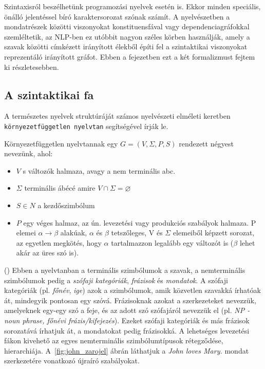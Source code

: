 Szintaxisról beszélhetünk programozási nyelvek esetén is. Ekkor minden speciális, önálló jelentéssel bíró karaktersorozat szónak számít.
A nyelvészetben a mondatrészek közötti viszonyokat konstituensfával vagy dependenciagráfokkal szemléltetik, az NLP-ben ez utóbbit nagyon széles körben használják, amely a szavak közötti címkézett irányított élekből építi fel a szintaktikai viszonyokat reprezentáló irányított gráfot. Ebben a fejezetben ezt a két formalizmust fejtem ki részletesebben.

\subsection{A szintaktikai fa}
\label{sec:tree}

A természetes nyelvek struktúráját számos nyelvészeti elméleti keretben \texttt{környezetfüggetlen nyelvtan} segítségével írják le.

Környezetfüggetlen nyelvtannak egy $G=(V,\Sigma ,P,S)$ rendezett négyest nevezünk, ahol:

\begin{itemize}
	\item \emph{$V$} s változók halmaza, avagy a nem terminális abc.
	\item \emph{$\Sigma$} terminális ábécé amire $ V \cap \Sigma =\varnothing $
	\item \emph{$S \in N$} a kezdőszimbólum
	\item \emph{$P$} egy véges halmaz, az ún. levezetési vagy produkciós szabályok halmaza. P elemei
$\alpha \to \beta$ alakúak, $\alpha$ és $\beta$ tetszőleges, V és $\Sigma$ elemeiből képzett sorozat, az egyetlen
megkötés, hogy $\alpha$ tartalmazzon legalább egy változót is ($\beta$ lehet akár az üres szó is).
\end{itemize}
(\cite{Friedl:2003})
Ebben a nyelvtanban a terminális szimbólumok a szavak, a nemterminális szimbólumok pedig a \textit{szófaji kategóriák}, \textit{frázisok} és \textit{mondatok}. A szófaji kategóriák (pl. \textit{főnév}, \textit{ige}) azok a szimbólumok, amik közvetlen szavakká írhatóak át, mindegyik pontosan egy szóvá. Frázisoknak azokat a szerkezeteket nevezzük, amelyeknek egy-egy szó a feje, és az adott szó szófajáról nevezzük el (pl. \textit{NP - noun phrase, főnévi frázis/kifejezés}). Ezeket szófaji kategóriák és más frázisok sorozatává írhatjuk át, a mondatokat pedig frázisokká.
A lehetséges levezetési fákon kivehető az egyes nemterminális szimbólumtípusok rétegződése, hierarchiája.  A~\ref{fig:john_zarojel} ábrán láthatjuk a \textit{John loves Mary.} mondat szerkezetére vonatkozó újraíró szabályokat.

